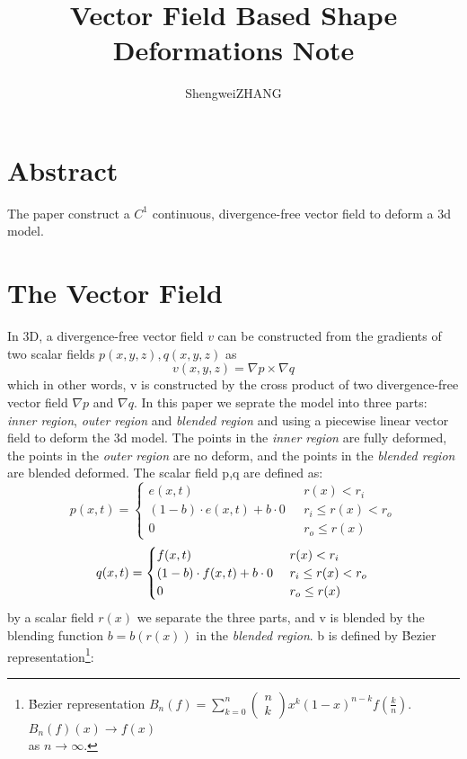 \documentclass{article}
\title{Vector Field Based Shape Deformations Note}
\author{ShengweiZHANG\\
}
\theoremstyle{definition}
\theoremstyle{remark}
\begin{document}
\maketitle


\section{Abstract}
The paper construct a $C^1$ continuous, divergence-free vector field to deform a 3d model.
\section{The Vector Field}
In 3D, a divergence-free vector field $v$ can be constructed from the gradients of two scalar fields $p(x,y,z), q(x,y,z)$ as
\begin{equation}
  v(x,y,z) = \nabla p \times \nabla q
\end{equation}
which in other words, v is constructed by the cross product of two divergence-free vector field $\nabla p$ and $\nabla q$.
In this paper we seprate the model into three parts: \textit{inner region}, \textit{outer region} and \textit{blended region} and using a piecewise linear vector field to deform the 3d model.
The points in the \textit{inner region} are fully deformed, the points in the \textit{outer region} are no deform, and the points in the \textit{blended region} are blended deformed.
The scalar field p,q are defined as:
\begin{equation}
  p(x,t)=\begin{cases} e(x,t) & \mbox{ } r(x)<r_i\\
  (1-b)\cdot e(x,t) + b \cdot 0 &\mbox{ } r_i \le r(x) < r_o\\
  0 &  \mbox{ } r_o \le r(x) \end{cases}
\end{equation}
\begin{equation}
  q(x,t)=\begin{cases} f(x,t) & \mbox{ } r(x)<r_i\\
  (1-b)\cdot f(x,t) + b \cdot 0 &\mbox{ } r_i \le r(x) < r_o\\
  0 &  \mbox{ } r_o \le r(x) \end{cases}\\
\end{equation}
by a scalar field $r(x)$ we separate the three parts, and v is blended by the blending function $b=b(r(x))$ in the \textit{blended region}. b is defined by B́ezier representation\footnote{\noindent B́ezier representation $B_n(f)=\sum\limits_{k=0}^n \left(\begin{array}{c} n\\k \end{array}\right)x^k(1-x)^{n-k} f(\frac{k}{n})$. $B_n(f)(x) \rightarrow f(x)$ \\as $n\rightarrow \infty$.}:
\end{document}
